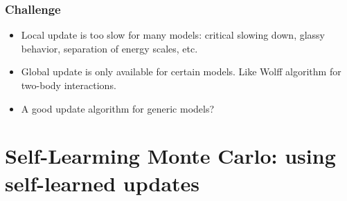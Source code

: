 \documentclass[xcolor=table, 10pt, aspectratio=169]{beamer}
\begin{document}
\begin{frame}
  \frametitle{Challenge}
  \begin{itemize}
    \item Local update is too slow for many models: critical slowing down, glassy behavior, separation of energy scales, etc.
    \item Global update is only available for certain models. Like Wolff algorithm for two-body interactions.
    \item A good update algorithm for generic models?
  \end{itemize}
\end{frame}


\section{Self-Learming Monte Carlo: using self-learned updates}
\end{document}

